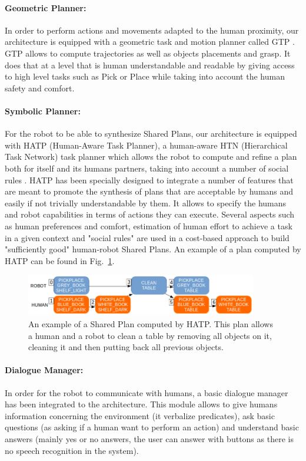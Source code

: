 \documentclass[english,a4paper,11pt,twoside]{StyleThese}
\begin{document}
\paragraph{Geometric Planner:}
In order to perform actions and movements adapted to the human proximity, our architecture is equipped with a geometric task and motion planner called GTP \cite{waldhart2016novel}. GTP allows to compute trajectories as well as objects placements and grasp. It does that at a level that is human understandable and readable by giving access to high level tasks such as Pick or Place while taking into account the human safety and comfort.

\paragraph{Symbolic Planner:}
For the robot to be able to synthesize Shared Plans, our architecture is equipped with HATP (Human-Aware Task Planner), a human-aware HTN (Hierarchical Task Network) task planner which allows the robot to compute and refine a plan both for itself and its humans partners, taking into account a number of social rules \cite{Lallement2014hatp}.
HATP has been specially designed to integrate a number of features that are meant to promote the synthesis of plans that are acceptable by humans and easily if not trivially understandable by them. It allows to specify the humans and robot capabilities in terms of actions they can execute. Several aspects such as human preferences and comfort, estimation of human effort to achieve a task in a given context and "social rules" are used in a cost-based approach to build "sufficiently good" human-robot Shared Plans. An example of a plan computed by HATP can be found in Fig.~\ref{fig:planHATP}.

\begin{figure}[!h]
	\centering
    \includegraphics[width=0.9\textwidth]{figs/Chapter2/SharedPlan.png}
    \caption{An example of a Shared Plan computed by HATP. This plan allows a human and a robot to clean a table by removing all objects on it, cleaning it and then putting back all previous objects.}
    \label{fig:planHATP}
\end{figure}


\paragraph{Dialogue Manager:}
In order for the robot to communicate with humans, a basic dialogue manager has been integrated to the architecture. This module allows to give humans information concerning the environment (it verbalize predicates), ask basic questions (as asking if a human want to perform an action) and understand basic answers (mainly yes or no answers, the user can answer with buttons as there is no speech recognition in the system). 
\end{document}
